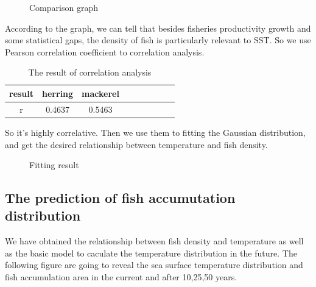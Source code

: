 \documentclass{mcmthesis}
\begin{document}
 \begin{figure}[tbp]
\caption{Comparison graph}\label{figure1}
 \end{figure}

  According to the graph, we can tell that besides fisheries productivity growth and some statistical gaps, the density of fish is particularly relevant to SST. So we use Pearson correlation coefficient to correlation analysis. 

  \begin{table}[h]
    \centering
    \setlength{\abovecaptionskip}{0pt}%
    \setlength{\belowcaptionskip}{15pt}%
    \caption{The result of correlation analysis}
    \begin{tabular}{ccccccccc}
    \toprule[1.5pt]
    result &herring &mackerel\\
    \toprule[1.5pt]
    r&0.4637&0.5463\\
    \bottomrule[1.5pt]
    \end{tabular}
  \end{table}

  So it's highly correlative. Then we use them to fitting the Gaussian distribution, and get the desired relationship between temperature and fish density.

 \begin{figure}[h]
   \caption{Fitting result}\label{figure1}
 \end{figure}

\subsection{The prediction of fish accumutation distribution}
  We have obtained the relationship between fish density and temperature as well as the basic model to caculate the temperature distribution in the future. The following figure are going to reveal the sea surface temperature distribution and fish accumulation area in the current and after 10,25,50 years. 
\end{document}
